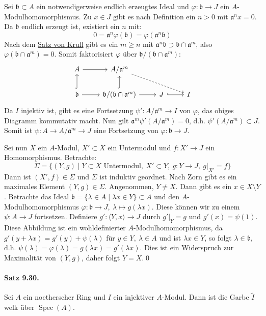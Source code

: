 Sei $\mathfrak{b}\subset A$ ein notwendigerweise endlich erzeugtes Ideal und $\varphi:\mathfrak{b}\to J$ ein $A$-Modulhomomorphismus. Zu $x\in J$ gibt es nach Definition ein $n>0$ mit $\mathfrak{a}^nx=0$. Da $\mathfrak{b}$ endlich erzeugt ist, existiert ein $n$ mit:
\[0=\mathfrak{a}^n\varphi(\mathfrak{b})=\varphi(\mathfrak{a}^n\mathfrak{b}) \]
Nach dem \hyperref[prop:krull]{Satz von Krull} gibt es ein $m\geq n$ mit $\mathfrak{a}^n\mathfrak{b}\supset\mathfrak{b}\cap\mathfrak{a}^m$, also $\varphi(\mathfrak{b}\cap\mathfrak{a}^m)=0$. Somit faktorisiert $\varphi$ über $\mathfrak{b}/(\mathfrak{b}\cap\mathfrak{a}^m)$:
\[\begin{tikzcd}
A \rar & A/\mathfrak{a}^m\ar[rrd, dashed] &&\\
\mathfrak{b} \uar[hook]\rar & \mathfrak{b}/(\mathfrak{b}\cap\mathfrak{a}^m) \uar[hook]\rar & J\rar[hook] & I
\end{tikzcd}\]
Da $I$ injektiv ist, gibt es eine Fortsetzung $\psi':A/\mathfrak{a}^m\to I$ von $\varphi$, das obiges Diagramm kommutativ macht. Nun gilt $\mathfrak{a}^m\psi'(A/\mathfrak{a}^m)=0$, d.h. $\psi'(A/\mathfrak{a}^m)\subset J$. Somit ist $\psi:A\to A/\mathfrak{a}^m\to J$ eine Fortsetzung von $\varphi:\mathfrak{b}\to J$.

Sei nun $X$ ein $A$-Modul, $X'\subset X$ ein Untermodul und $f:X'\to J$ ein Homomorphismus. Betrachte:
\[\Sigma=\{(Y,g)\mid Y\subset X\text{ Untermodul},\ X'\subset Y,\ g:Y\to J,\ g|_{X'}=f \} \]
Dann ist $(X',f)\in\Sigma$ und $\Sigma$ ist induktiv geordnet. Nach Zorn gibt es ein maximales Element $(Y,g)\in\Sigma$. Angenommen, $Y\neq X$. Dann gibt es ein $x\in X\setminus Y$. Betrachte das Ideal $\mathfrak{b}=\{\lambda\in A\mid\lambda x\in Y\}\subset A$ und den $A$-Modulhomomorphismus $\varphi:\mathfrak{b}\to J,\ \lambda\mapsto g(\lambda x)$. Diese können wir zu einem $\psi:A\to J$ fortsetzen. Definiere $g':\langle Y,x\rangle\to J$ durch $g'|_Y=g$ und $g'(x)=\psi(1)$. Diese Abbildung ist ein wohldefinierter $A$-Modulhomomorphismus, da $g'(y+\lambda x)=g'(y)+\psi(\lambda)$ für $y\in Y,\ \lambda\in A$ und ist $\lambda x\in Y$, so folgt $\lambda\in\mathfrak{b}$, d.h. $\psi(\lambda)=\varphi(\lambda)=g(\lambda x)=g'(\lambda x)$. Dies ist ein Widerspruch zur Maximalität von $(Y,g)$, daher folgt $Y=X$.\qed

\paragraph{Satz 9.30.}\label{9.30} Sei $A$ ein noetherscher Ring und $I$ ein injektiver $A$-Modul. Dann ist die Garbe $\widetilde{I}$ welk über $\operatorname{Spec}(A)$.


